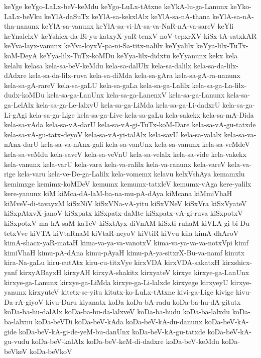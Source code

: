 {keYge
keYgo-LaLx-beV-keMdu
keYgo-LuLx-tAtxne
keYkA-lu-ga-Lanunx
keYko-LaLx-beVku
keYlA-daSuTx
keYlA-sa-kekxlAlx
keYlA-sa-nA-thana
keYlA-sa-nA-tha-nanunx
keYlA-sa-vanunx
keYlA-sa-vi-lA-sa-va-NaR-nA-va-sareV
keYli
keYnalelxV
keYshicx-da-Bi-yu-katxyX-yaR-tenxV-noV-tepxrXV-kiSx-tA-satxkAR
keYva-layx-vanunx
keYva-loyxV-pa-ni-Sa-titx-nalilx
keYyalilx
keYya-lilx-TuTx-koM-DeyA
keYya-lilx-TuTx-koMDu
keYya-lilx-didxtu
keYyanunx
kekx
kela
kelalu
kelasa
kela-sa-beV-keMdu
kela-sa-dalUlx
kela-sa-dalilx
kela-sa-da-lilx-dAdxre
kela-sa-da-lilx-ruva
kela-sa-diMda
kela-sa-gAra
kela-sa-gA-ra-nanunx
kela-sa-gA-rareV
kela-sa-gaLU
kela-sa-gaLa
kela-sa-ga-Lalilx
kela-sa-ga-La-lilx-dudx-koMDu
kela-sa-ga-LanUnx
kela-sa-ga-LanenxV
kela-sa-ga-Lanunx
kela-sa-ga-LelAlx
kela-sa-ga-Le-lalxvU
kela-sa-ga-LiMda
kela-sa-ga-Li-dadxrU
kela-sa-ga-Li-gAgi
kela-sa-ga-Lige
kela-sa-ga-Live
kela-sa-gaLu
kela-sakekx
kela-sa-mA-Dida
kela-sa-vAda
kela-sa-vA-darU
kela-sa-vA-gi-TuTx-koM-Dare
kela-sa-vA-gu-tatxde
kela-sa-vA-gu-tatx-deyoV
kela-sa-vA-yi-talAlx
kela-savU
kela-sa-valalx
kela-sa-va-nAnx-darU
kela-sa-va-nAnx-gali
kela-sa-vanUnx
kela-sa-vanunx
kela-sa-veMdeV
kela-sa-veMdu
kela-saveV
kela-sa-veVnU
kela-sa-velalx
kela-sa-vide
kela-vakekx
kela-vanunx
kela-varU
kela-vara
kela-va-ralilx
kela-va-ranunx
kela-vareV
kela-va-rige
kela-varu
kela-ve-De-ga-Lalilx
kela-vomemx
kelavu
kelxVshAya
kemamxlu
kemimxge
kemimx-koMDeV
kemumx
kemumx-tatxleV
kemumx-vAga
kere-yalilx
kere-yanunx
kiM
kiMca-dA-laM-ba-na-mu-pA-dAya
kiMcana
kiMmiVhaH
kiMveV-di-tavayxM
kiSxNiV
kiSxVNa-vA-yitu
kiSxVNeV
kiSxVra
kiSxVyateV
kiSxpAtxvX-janoV
kiSxpatx
kiSxpatx-daMte
kiSxpatx-vA-gi-ruva
kiSxpotxV
kiSxpotxV-ma-hA-saM-kaTeV
kiSxtAyx-diVnAM
kiSxti-ruhaM
kiVLA-gi-bi-Du-tetxVve
kiVTA
kiVtaRnaM
kiVtaR-neyoV
kiVtiR
kiVvu
kila
kimA-dhAroV
kimA-shacx-yaR-mataH
kima-va-ya-va-vanotxV
kima-va-ya-va-va-notxVpi
kimf
kimiVhaH
kimu-pA-dAna
kimu-pAyaH
kimu-pA-ya-sitxrX-Bu-va-namf
kinutx
kira-Na-gaLu
kiru-cutAtx
kiru-cu-titxVye
kirxVDA
kirxVDA-sakatxH
kirxshicx-yanf
kirxyABayxH
kirxyAH
kirxyA-shakitx
kirxyateV
kirxye
kirxye-ga-LanUnx
kirxye-ga-Lanunx
kirxye-ga-LiMda
kirxye-ga-Li-lalxde
kirxyege
kirxyeyU
kirxye-yanunx
kirxyuteV
kitetx-se-yitu
kitutx-ko-LuLx-tAtxne
kivi-ga-Lige
kivige
kivu-Da-rA-giyoV
kivu-Daru
kiyanatx
koDa
koDa-bA-radu
koDa-ba-hu-dA-gitutx
koDa-ba-hu-dalAlx
koDa-ba-hu-da-lalxveV
koDa-ba-hudu
koDa-ba-lalxdu
koDa-ba-lalxnu
koDa-beVDi
koDa-beV-kAda
koDa-beV-kA-du-danunx
koDa-beV-kA-gide
koDa-beV-kA-gi-de-yeM-bu-danUnx
koDa-beV-kA-gu-tatxde
koDa-beV-kA-gu-vudu
koDa-beV-kalAlx
koDa-beV-keM-di-dadxre
koDa-beV-keMdu
koDa-beVkeV
koDa-beVkoV
}
